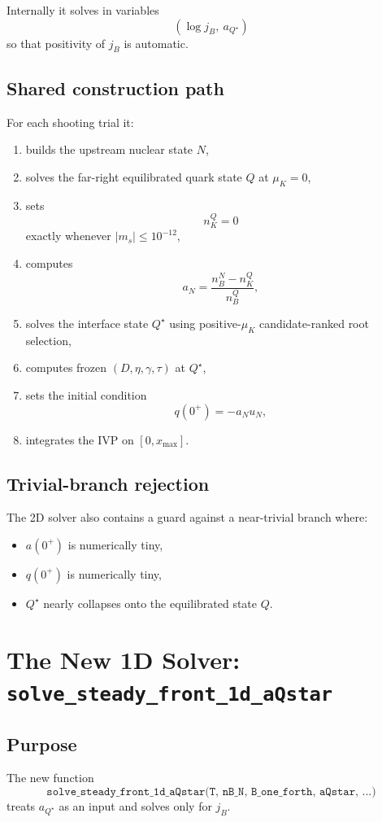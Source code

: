 \documentclass[11pt]{article}
\begin{document}
Internally it solves in variables
\[
(\log j_B,\ a_{Q^\star})
\]
so that positivity of $j_B$ is automatic.

\subsection{Shared construction path}
For each shooting trial it:
\begin{enumerate}[leftmargin=1.5em]
\item builds the upstream nuclear state $N$,
\item solves the far-right equilibrated quark state $Q$ at $\mu_K=0$,
\item sets
      \[
      n_K^Q = 0
      \]
      exactly whenever $|m_s| \le 10^{-12}$,
\item computes
      \[
      a_N = \frac{n_B^N - n_K^Q}{n_B^Q},
      \]
\item solves the interface state $Q^\star$ using positive-$\mu_K$
      candidate-ranked root selection,
\item computes frozen $(D,\eta,\gamma,\tau)$ at $Q^\star$,
\item sets the initial condition
      \[
      q(0^+) = - a_N u_N,
      \]
\item integrates the IVP on $[0, x_{\max}]$.
\end{enumerate}

\subsection{Trivial-branch rejection}
The 2D solver also contains a guard against a near-trivial branch where:
\begin{itemize}[leftmargin=1.5em]
\item $a(0^+)$ is numerically tiny,
\item $q(0^+)$ is numerically tiny,
\item $Q^\star$ nearly collapses onto the equilibrated state $Q$.
\end{itemize}

\iffalse
\section{The New 1D Solver: \texttt{solve\_steady\_front\_1d\_aQstar}}
\subsection{Purpose}
The new function
\[
\texttt{solve\_steady\_front\_1d\_aQstar(T, nB\_N, B\_one\_forth, aQstar, ...)}
\]
treats $a_{Q^\star}$ as an input and solves only for $j_B$.
\end{document}

